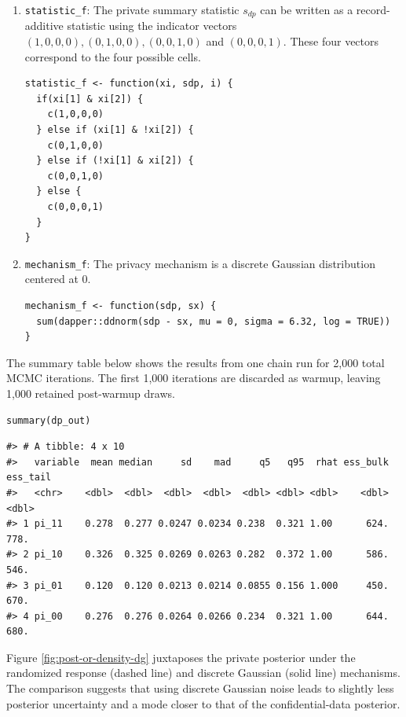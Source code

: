 \begin{enumerate}
\def\labelenumi{\arabic{enumi}.}
\item
  \texttt{statistic\_f}: The private summary statistic \(s_{dp}\) can be written as a record-additive
  statistic using the indicator vectors \((1,0,0,0), (0,1,0,0), (0,0,1,0)\) and \((0,0,0,1)\).
  These four vectors correspond to the four possible cells.

\begin{verbatim}
statistic_f <- function(xi, sdp, i) {
  if(xi[1] & xi[2]) {
    c(1,0,0,0)
  } else if (xi[1] & !xi[2]) {
    c(0,1,0,0)
  } else if (!xi[1] & xi[2]) {
    c(0,0,1,0)
  } else {
    c(0,0,0,1)
  }
}
\end{verbatim}
\item
  \texttt{mechanism\_f}: The privacy mechanism is a discrete Gaussian distribution centered
  at 0.

\begin{verbatim}
mechanism_f <- function(sdp, sx) {
  sum(dapper::ddnorm(sdp - sx, mu = 0, sigma = 6.32, log = TRUE))
}
\end{verbatim}
\end{enumerate}

The summary table below shows the results from one chain run for 2,000 total
MCMC iterations. The first 1,000 iterations are discarded as warmup, leaving
1,000 retained post-warmup draws.

\begin{verbatim}
summary(dp_out)
\end{verbatim}

\begin{verbatim}
#> # A tibble: 4 x 10
#>   variable  mean median     sd    mad     q5   q95  rhat ess_bulk ess_tail
#>   <chr>    <dbl>  <dbl>  <dbl>  <dbl>  <dbl> <dbl> <dbl>    <dbl>    <dbl>
#> 1 pi_11    0.278  0.277 0.0247 0.0234 0.238  0.321 1.00      624.     778.
#> 2 pi_10    0.326  0.325 0.0269 0.0263 0.282  0.372 1.00      586.     546.
#> 3 pi_01    0.120  0.120 0.0213 0.0214 0.0855 0.156 1.000     450.     670.
#> 4 pi_00    0.276  0.276 0.0264 0.0266 0.234  0.321 1.00      644.     680.
\end{verbatim}

Figure \ref{fig:post-or-density-dg} juxtaposes the private posterior under the
randomized response (dashed line) and discrete Gaussian (solid line) mechanisms. The
comparison suggests that using discrete Gaussian noise leads to slightly less posterior
uncertainty and a mode closer to that of the confidential-data posterior.

